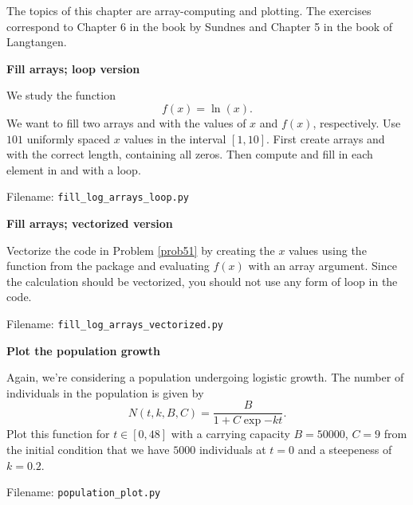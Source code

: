 The topics of this chapter are array-computing and plotting. The exercises correspond to
Chapter 6 in the book by Sundnes and Chapter 5 in the book of Langtangen.

\begin{Problem}{\textbf{Fill arrays; loop version}} \label{prob51}

\noindent We study the function
\begin{equation*}
f(x) = \ln(x).
\end{equation*}
We want to fill two arrays  and  with the values of $x$ and $f(x)$,
respectively. Use $101$ uniformly spaced $x$ values in the interval $[1, 10]$.
First create arrays  and  with the correct length, containing
all zeros. Then compute and fill in each element in
 and  with a  loop.

Filename: \texttt{fill\_log\_arrays\_loop.py}
\end{Problem}

\begin{Problem}{\textbf{Fill arrays; vectorized version}}

\noindent Vectorize the code in Problem \ref{prob51} by creating the $x$ values using the
 function from the  package and evaluating
$f(x)$ with an array argument. Since the calculation should be vectorized, you should not
use any form of loop in the code.

Filename: \texttt{fill\_log\_arrays\_vectorized.py}
\end{Problem}



\begin{Problem}{\textbf{Plot the population growth}}

\noindent Again, we're considering a population undergoing logistic growth. The number of
individuals in the population is given by
\begin{equation*}
N(t, k, B, C) = \frac{B}{1 + C \exp{-kt}}.
\end{equation*}
Plot this function for $t \in [0, 48]$ with a carrying capacity $B = 50 000$,
$C = 9$ from the initial condition that we have $5 000$ individuals at $t = 0$
and a steepeness of $k = 0.2$.

Filename: \texttt{population\_plot.py}
\end{Problem}

